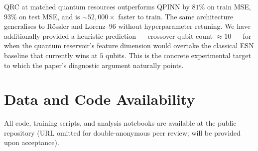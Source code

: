\documentclass[11pt,a4paper]{article}
\begin{document}
QRC at matched quantum resources outperforms QPINN by $81\%$ on
train MSE, $93\%$ on test MSE, and is $\sim\!52{,}000\times$ faster
to train. The same architecture generalises to R\"{o}ssler and
Lorenz--96 without hyperparameter retuning. We have additionally
provided a heuristic prediction --- crossover qubit count
$\approx 10$ --- for when the quantum reservoir's feature dimension
would overtake the classical ESN baseline that currently wins at
$5$ qubits. This is the concrete experimental target to which the
paper's diagnostic argument naturally points.

\section*{Data and Code Availability}
\label{sec:availability}

All code, training scripts, and analysis notebooks are available at
the public repository (URL omitted for double-anonymous peer review;
will be provided upon acceptance).
\end{document}
